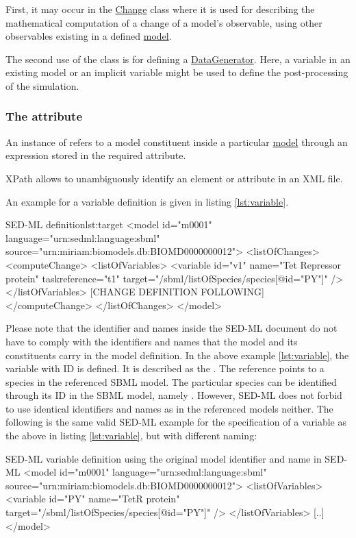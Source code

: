 First, it may occur in the \hyperref[class:change]{Change} class where it is used for describing the mathematical computation of a change of a model's observable, using other observables existing in a defined \hyperref[class:model]{model}.

The second use of the  class is for defining a \hyperref[class:dataGenerator]{DataGenerator}. Here, a variable in an existing model or an implicit variable might be used to define the post-processing of the simulation.

\subsubsection{The  attribute}
\label{sec:target}
An instance of  refers to a model constituent inside a particular \hyperref[class:model]{model} through an  expression stored in the required  attribute. 

XPath allows to unambiguously identify an element or attribute in an XML file.

An example for a variable definition is given in listing \ref{lst:variable}.
%
\begin{myXmlLst}{SED-ML  definition}{lst:target}
<model id="m0001" language="urn:sedml:language:sbml" source="urn:miriam:biomodels.db:BIOMD0000000012">
 <listOfChanges>
  <computeChange>
   <listOfVariables>
    <variable id="v1" name="Tet Repressor protein" taskreference="t1"  target="/sbml/listOfSpecies/species[@id="PY"]" />
   </listOfVariables>
   [CHANGE DEFINITION FOLLOWING]
  </computeChange>
 </listOfChanges>
</model>
\end{myXmlLst}
%
Please note that the identifier and names inside the SED-ML document do not have to comply with the identifiers and names that the model and its constituents carry in the model definition. In the above example \ref{lst:variable}, the variable with ID  is defined. It is described as the . The reference points to a species in the referenced SBML model. The particular species can be identified through its ID in the SBML model, namely . However, SED-ML does not forbid to use identical identifiers and names as in the referenced models neither. The following is the same valid SED-ML example for the specification of a variable as the above in listing \ref{lst:variable}, but with different naming:
%
\begin{myXmlLst}{SED-ML variable definition using the original model identifier and name in SED-ML}{}
<model id="m0001" language="urn:sedml:language:sbml" source="urn:miriam:biomodels.db:BIOMD0000000012">
 <listOfVariables>
  <variable id="PY" name="TetR protein" target="/sbml/listOfSpecies/species[@id="PY"]" />
 </listOfVariables>
 [..]
</model>
\end{myXmlLst}
%

